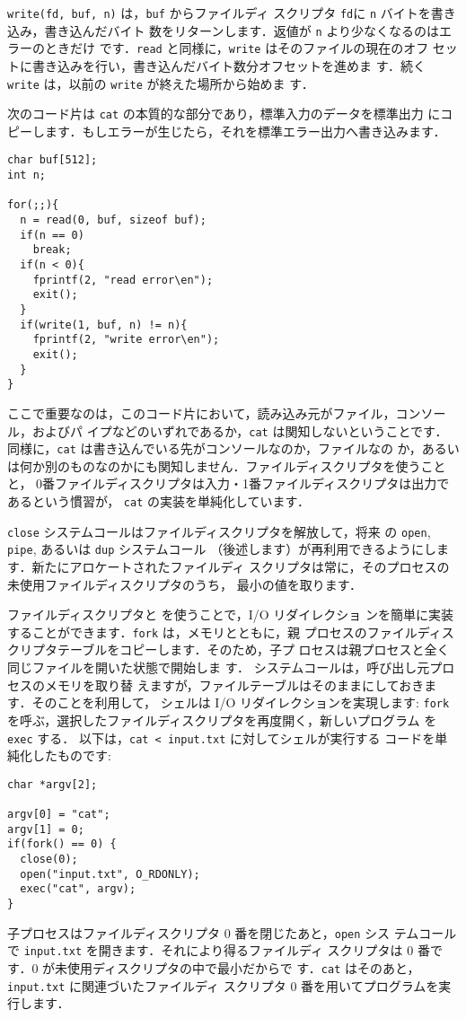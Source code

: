 \lstinline{write(fd, buf, n)} は，\lstinline{buf} からファイルディ
スクリプタ \lstinline{fd}に \lstinline{n} バイトを書き込み，書き込んだバイト
数をリターンします．返値が \lstinline{n} より少なくなるのはエラーのときだけ
です．\lstinline{read} と同様に，\lstinline{write} はそのファイルの現在のオフ
セットに書き込みを行い，書き込んだバイト数分オフセットを進めま
す．続く \lstinline{write} は，以前の \lstinline{write} が終えた場所から始めま
す．

次のコード片は \lstinline{cat} の本質的な部分であり，標準入力のデータを標準出力
にコピーします．もしエラーが生じたら，それを標準エラー出力へ書き込みます．
\begin{lstlisting}[]
char buf[512];
int n;

for(;;){
  n = read(0, buf, sizeof buf);
  if(n == 0)
    break;
  if(n < 0){
    fprintf(2, "read error\en");
    exit();
  }
  if(write(1, buf, n) != n){
    fprintf(2, "write error\en");
    exit();
  }
}
\end{lstlisting}
ここで重要なのは，このコード片において，読み込み元がファイル，コンソール，およびパ
イプなどのいずれであるか，\lstinline{cat} は関知しないということです．
同様に，\lstinline{cat} は書き込んでいる先がコンソールなのか，ファイルなの
か，あるいは何か別のものなのかにも関知しません．ファイルディスクリプタを使うことと，
0番ファイルディスクリプタは入力・1番ファイルディスクリプタは出力であるという慣習が，
\lstinline{cat} の実装を単純化しています．

\lstinline{close} システムコールはファイルディスクリプタを解放して，将来
の \lstinline{open}, \lstinline{pipe}, あるいは \lstinline{dup} システムコール
（後述します）が再利用できるようにします．新たにアロケートされたファイルディ
スクリプタは常に，そのプロセスの未使用ファイルディスクリプタのうち，
最小の値を取ります．


ファイルディスクリプタと  を使うことで，I/O リダイレクショ
ンを簡単に実装することができます．\lstinline{fork} は，メモリとともに，親
プロセスのファイルディスクリプタテーブルをコピーします．そのため，子プ
ロセスは親プロセスと全く同じファイルを開いた状態で開始しま
す． システムコールは，呼び出し元プロセスのメモリを取り替
えますが，ファイルテーブルはそのままにしておきます．そのことを利用して，
シェルは I/O リダイレクションを実現します: \lstinline{fork}
を呼ぶ，選択したファイルディスクリプタを再度開く，新しいプログラム
を \lstinline{exec} する．
%
以下は，\lstinline{cat < input.txt} に対してシェルが実行する
コードを単純化したものです:
\begin{lstlisting}[]
char *argv[2];

argv[0] = "cat";
argv[1] = 0;
if(fork() == 0) {
  close(0);
  open("input.txt", O_RDONLY);
  exec("cat", argv);
}
\end{lstlisting}
子プロセスはファイルディスクリプタ 0 番を閉じたあと，\lstinline{open} シス
テムコールで \lstinline{input.txt} を開きます．それにより得るファイルディ
スクリプタは 0 番です．0 が未使用ディスクリプタの中で最小だからで
す．\lstinline{cat} はそのあと，\lstinline{input.txt} に関連づいたファイルディ
スクリプタ 0 番を用いてプログラムを実行します．


